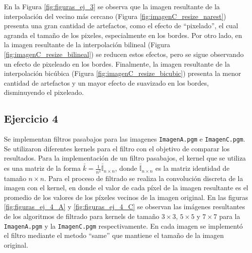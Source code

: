\documentclass[11pt, twocolumn]{article}
\begin{document}
En la Figura \ref{fig:figuras_ej_3} se observa que la imagen resultante de la interpolación del vecino más cercano (Figura \ref{fig:imagenC_resize_narest}) presenta una gran cantidad de artefactos, como el efecto de ``pixelado'', el cual agranda el tamaño de los pixeles, especialmente en los bordes. Por otro lado, en la imagen resultante de la interpolación bilineal (Figura \ref{fig:imagenC_resize_bilineal}) se reducen estos efectos, pero se sigue observando un efecto de pixeleado en los bordes. Finalmente, la imagen resultante de la interpolación bicúbica (Figura \ref{fig:imagenC_resize_bicubic}) presenta la menor cantidad de artefactos y un mayor efecto de suavizado en los bordes, disminuyendo el pixeleado.

\subsection*{Ejercicio 4}
Se implementan filtros pasabajos para las imagenes \texttt{ImagenA.pgm} e \texttt{ImagenC.pgm}. Se utilizaron diferentes kernels para el filtro con el objetivo de comparar los resultados. Para la implementación de un filtro pasabajos, el kernel que se utiliza es una matriz de la forma $\overline{\overline{k} }  = \frac{1}{n^2} \overline{\overline{\mathbb{I}}}_{n\times n}$, donde $\overline{\overline{\mathbb{I}}}_{n\times n}$ es la matriz identidad de tamaño $n \times n$. Para el proceso de filtrado se realiza la convolución discreta de la imagen con el kernel, en donde el valor de cada píxel de la imagen resultante es el promedio de los valores de los píxeles vecinos de la imagen original. En las figuras \ref{fig:figuras_ej_4_A} y \ref{fig:figuras_ej_4_C} se observan las imágenes resultantes de los algoritmos de filtrado para kernels de tamaño $3 \times 3$, $5 \times 5$ y $7 \times 7$ para la \texttt{ImagenA.pgm} y la \texttt{ImagenC.pgm} respectivamente. En cada imagen se implementó el filtro mediante el metodo ``same'' que mantiene el tamaño de la imagen original.
\end{document}
